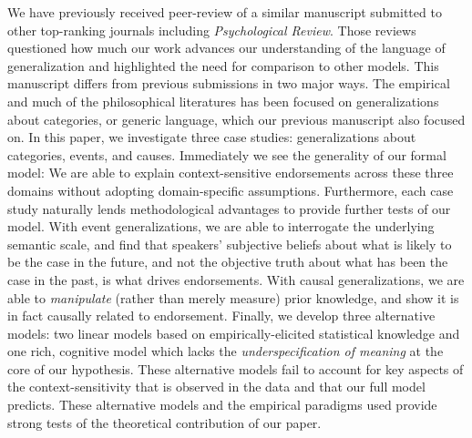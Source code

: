 \documentclass[11pt,letterpaper]{letter} %
\begin{document}
\begin{letter}
We have previously received peer-review of a similar manuscript submitted to other top-ranking journals including \emph{Psychological Review}.
Those reviews questioned how much our work advances our understanding of the language of generalization and highlighted the need for comparison to other models. 
This manuscript differs from previous submissions in two major ways.
The empirical and much of the philosophical literatures has been focused on generalizations about categories, or generic language, which our previous manuscript also focused on.
In this paper, we investigate three case studies: generalizations about categories, events, and causes. 
Immediately we see the generality of our formal model: We are able to explain context-sensitive endorsements across these three domains without adopting domain-specific assumptions.
Furthermore, each case study naturally lends methodological advantages to provide further tests of our model.
With event generalizations, we are able to interrogate the underlying semantic scale, and find that speakers' subjective beliefs about what is likely to be the case in the future, and not the objective truth about what has been the case in the past, is what drives endorsements. 
With causal generalizations, we are able to \emph{manipulate} (rather than merely measure) prior knowledge, and show it is in fact causally related to endorsement. 
Finally, we develop three alternative models: two linear models based on empirically-elicited statistical knowledge and one rich, cognitive model which lacks the \emph{underspecification of meaning} at the core of our hypothesis. 
These alternative models fail to account for key aspects of the context-sensitivity that is observed in the data and that our full model predicts.
These alternative models and the empirical paradigms used provide strong tests of the theoretical contribution of our paper. 







\end{letter}
\end{document}
